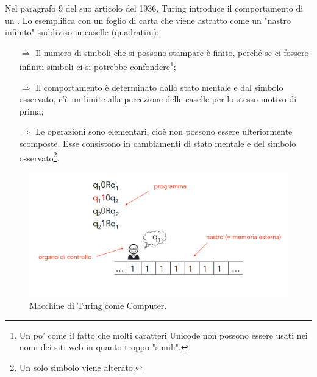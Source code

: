 Nel paragrafo 9 del suo articolo del 1936, Turing introduce
il comportamento di un . Lo esemplifica con un
foglio di carta che viene astratto come un "nastro infinito" suddiviso in
caselle (quadratini):
\begin{itemize}
    \item [$\Rightarrow$] Il numero di simboli che si possono stampare è finito,
    perché se ci fossero infiniti simboli ci si potrebbe confondere\footnote{Un po'
    come il fatto che molti caratteri Unicode non possono essere usati nei
    nomi dei siti web in quanto troppo "simili".};
    \item [$\Rightarrow$] Il comportamento è determinato dallo stato mentale
    e dal simbolo osservato, c'è un limite alla percezione delle caselle per lo stesso
    motivo di prima;
    \item [$\Rightarrow$] Le operazioni sono elementari, cioè non possono essere
    ulteriormente scomposte. Esse consistono in cambiamenti di stato mentale e  
    del simbolo osservato\footnote{Un solo simbolo viene alterato.}.
\end{itemize}

\begin{figure}[h]
    \centering
    \includegraphics[scale = 0.35]{images/Turing.png}
    \caption{Macchine di Turing come Computer.}
\end{figure}


